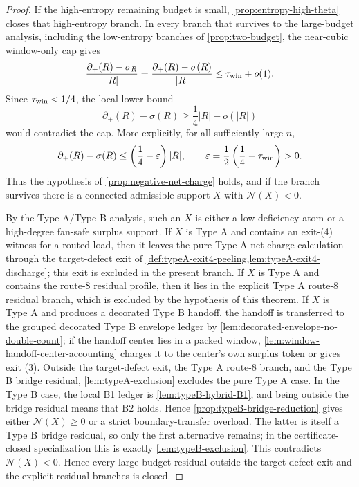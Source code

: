 \documentclass[11pt]{article}
\newcommand{\defp}{\partial_+}
\newcommand{\No}{\mathcal N}
\begin{document}
\begin{proof}
If the high-entropy remaining budget is small, \cref{prop:entropy-high-theta}
closes that high-entropy branch.  In every branch that survives to the
large-budget analysis, including the low-entropy branches of
\cref{prop:two-budget}, the near-cubic window-only cap gives
\[
\frac{\defp(R)-\sigma_R}{|R|}
=\frac{\defp(R)-\sigma(R)}{|R|}
\le\tau_{\rm win}+o(1).
\]
Since $\tau_{\rm win}<1/4$, the local lower bound
\[
\defp(R)-\sigma(R)\ge\frac14|R|-o(|R|)
\]
would contradict the cap.  More explicitly, for all sufficiently large $n$,
\[
\defp(R)-\sigma(R)
\le
\left(\frac14-\varepsilon\right)|R|,
\qquad
\varepsilon=\frac12\left(\frac14-\tau_{\rm win}\right)>0 .
\]
Thus the hypothesis of \cref{prop:negative-net-charge} holds, and if the branch
survives there is a connected admissible support $X$ with $\No(X)<0$.

By the Type A/Type B analysis, such an $X$ is either a low-deficiency atom or a
high-degree fan-safe surplus support.  If $X$ is Type A and contains an exit-(4)
witness for a routed load, then it leaves the pure Type A net-charge calculation
through the target-defect exit of
\cref{def:typeA-exit4-peeling,lem:typeA-exit4-discharge}; this exit is excluded
in the present branch.  If $X$ is Type A and contains the route-8 residual
profile, then it lies in the explicit Type A route-8 residual branch, which is
excluded by the hypothesis of this theorem.  If $X$ is Type A and produces a
decorated Type B handoff, the handoff is transferred to the
grouped decorated Type B envelope ledger by
\cref{lem:decorated-envelope-no-double-count}; if the handoff center lies in a
packed window, \cref{lem:window-handoff-center-accounting} charges it to the
center's own surplus token or gives exit (3).  Outside the target-defect exit,
the Type A route-8 branch, and the Type B bridge residual,
\cref{lem:typeA-exclusion} excludes the pure Type A case.  In the Type
B case, the local B1 ledger is \cref{lem:typeB-hybrid-B1}, and being outside the
bridge residual means that B2 holds.  Hence
\cref{prop:typeB-bridge-reduction} gives either $\No(X)\ge0$ or a strict
boundary-transfer overload.  The latter is itself a Type B bridge residual,
so only the first alternative remains; in the certificate-closed
specialization this is exactly \cref{lem:typeB-exclusion}.
This contradicts $\No(X)<0$.  Hence every large-budget residual outside the
target-defect exit and the explicit residual branches is closed.
\end{proof}
\end{document}

